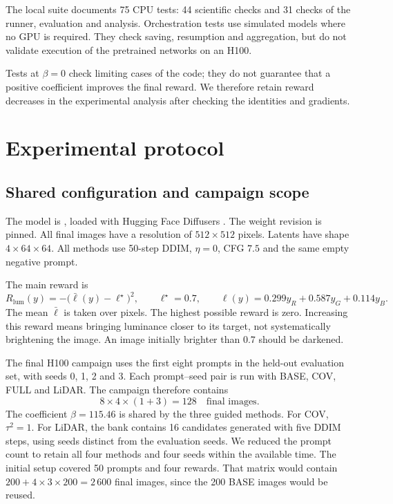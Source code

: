 \documentclass[11pt,a4paper]{article}
\newcommand{\code}[1]{\texttt{\detokenize{#1}}}
\begin{document}
The local suite documents 75 CPU tests: 44 scientific checks and 31 checks of the runner, evaluation and analysis. Orchestration tests use simulated models where no GPU is required. They check saving, resumption and aggregation, but do not validate execution of the pretrained networks on an H100.

Tests at $\beta=0$ check limiting cases of the code; they do not guarantee that a positive coefficient improves the final reward. We therefore retain reward decreases in the experimental analysis after checking the identities and gradients.

\section{Experimental protocol}
\subsection{Shared configuration and campaign scope}
The model is \code{stable-diffusion-v1-5/stable-diffusion-v1-5}, loaded with Hugging Face Diffusers \cite{ldm}. The weight revision is pinned. All final images have a resolution of $512\times512$ pixels. Latents have shape $4\times64\times64$. All methods use 50-step DDIM, $\eta=0$, CFG $7.5$ and the same empty negative prompt.

The main reward is
\begin{equation}\label{eq:luminance}
R_{\mathrm{lum}}(y)=-\bigl(\bar\ell(y)-\ell^\star\bigr)^2,
\qquad \ell^\star=0.7,
\qquad \ell(y)=0.299y_R+0.587y_G+0.114y_B.
\end{equation}
The mean $\bar\ell$ is taken over pixels. The highest possible reward is zero. Increasing this reward means bringing luminance closer to its target, not systematically brightening the image. An image initially brighter than $0.7$ should be darkened.

The final H100 campaign uses the first eight prompts in the held-out evaluation set, with seeds 0, 1, 2 and 3. Each prompt--seed pair is run with BASE, COV, FULL and LiDAR. The campaign therefore contains
\begin{equation}
8\times4\times(1+3)=128\quad\text{final images}.
\end{equation}
The coefficient $\beta=115.46$ is shared by the three guided methods. For COV, $\tau^2=1$. For LiDAR, the bank contains 16 candidates generated with five DDIM steps, using seeds distinct from the evaluation seeds. We reduced the prompt count to retain all four methods and four seeds within the available time. The initial setup covered 50 prompts and four rewards. That matrix would contain $200+4\times3\times200=2\,600$ final images, since the 200 BASE images would be reused.
\end{document}
